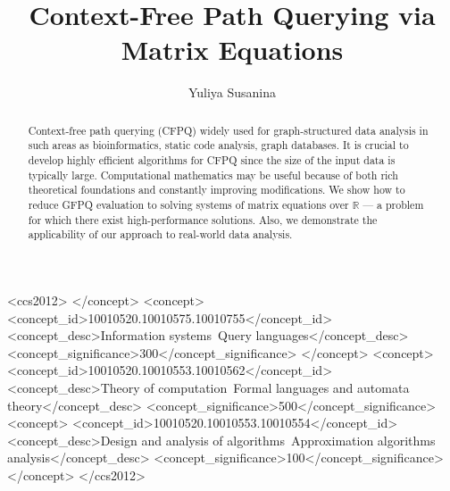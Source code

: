\documentclass[sigconf]{acmart}
\begin{document}
\title{Context-Free Path Querying via Matrix Equations}

\author{Yuliya Susanina}





\begin{abstract}
  Context-free path querying (CFPQ) widely used for graph-structured data analysis in such areas as bioinformatics, static code analysis, graph databases.
  It is crucial to develop highly efficient algorithms for CFPQ since the size of the input data is typically large.
  Computational mathematics may be useful because of both rich theoretical foundations and constantly improving modifications.
  We show how to reduce GFPQ evaluation to solving systems of matrix equations over $\mathbb{R}$ --- a problem for which there exist high-performance solutions.
  Also, we demonstrate the applicability of our approach to real-world data analysis.
\end{abstract}

\begin{CCSXML}
<ccs2012>
 </concept>
 <concept>
  <concept_id>10010520.10010575.10010755</concept_id>
  <concept_desc>Information systems~Query languages</concept_desc>
  <concept_significance>300</concept_significance>
 </concept>
 <concept>
  <concept_id>10010520.10010553.10010562</concept_id>
  <concept_desc>Theory of computation~Formal languages and automata theory</concept_desc>
  <concept_significance>500</concept_significance>
 <concept>
  <concept_id>10010520.10010553.10010554</concept_id>
  <concept_desc>Design and analysis of algorithms~Approximation algorithms analysis</concept_desc>
  <concept_significance>100</concept_significance>
 </concept>
</ccs2012>
\end{CCSXML}
\end{document}
